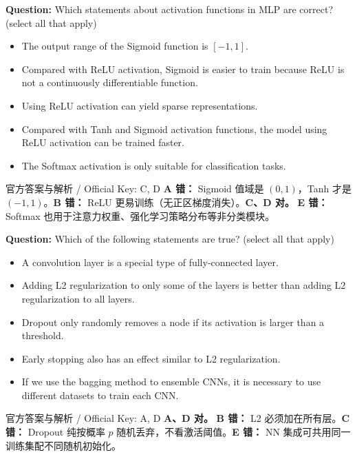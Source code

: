 \textbf{Question:} Which statements about activation functions in MLP are correct? (select all that apply)
\begin{itemize}
\item[A)] The output range of the Sigmoid function is $[-1, 1]$.
\item[B)] Compared with ReLU activation, Sigmoid is easier to train because ReLU is not a continuously differentiable function.
\item[C)] Using ReLU activation can yield sparse representations.
\item[D)] Compared with Tanh and Sigmoid activation functions, the model using ReLU activation can be trained faster.
\item[E)] The Softmax activation is only suitable for classification tasks.
\end{itemize}

\begin{StudySolution}{官方答案与解析 / Official Key: C, D}
\textbf{A 错：} Sigmoid 值域是 $(0,1)$，Tanh 才是 $(-1,1)$。\textbf{B 错：} ReLU 更易训练（无正区梯度消失）。\textbf{C、D 对。} \textbf{E 错：} Softmax 也用于注意力权重、强化学习策略分布等非分类模块。
\end{StudySolution}

\textbf{Question:} Which of the following statements are true? (select all that apply)
\begin{itemize}
\item[A)] A convolution layer is a special type of fully-connected layer.
\item[B)] Adding L2 regularization to only some of the layers is better than adding L2 regularization to all layers.
\item[C)] Dropout only randomly removes a node if its activation is larger than a threshold.
\item[D)] Early stopping also has an effect similar to L2 regularization.
\item[E)] If we use the bagging method to ensemble CNNs, it is necessary to use different datasets to train each CNN.
\end{itemize}

\begin{StudySolution}{官方答案与解析 / Official Key: A, D}
\textbf{A、D 对。} \textbf{B 错：} L2 必须加在所有层。\textbf{C 错：} Dropout 纯按概率 $p$ 随机丢弃，不看激活阈值。\textbf{E 错：} NN 集成可共用同一训练集配不同随机初始化。
\end{StudySolution}

